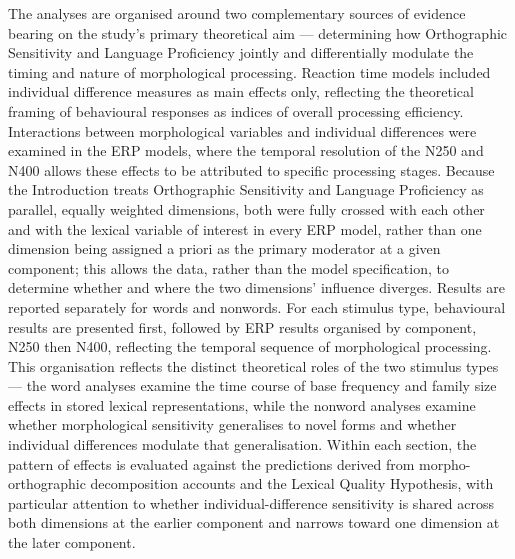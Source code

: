 \documentclass[utf8]{FrontiersinHarvard} %
\begin{document}
	The analyses are organised around two complementary sources of evidence bearing on the study's primary theoretical aim --- determining how Orthographic Sensitivity and Language Proficiency jointly and differentially modulate the timing and nature of morphological processing. Reaction time models included individual difference measures as main effects only, reflecting the theoretical framing of behavioural responses as indices of overall processing efficiency. Interactions between morphological variables and individual differences were examined in the ERP models, where the temporal resolution of the N250 and N400 allows these effects to be attributed to specific processing stages. Because the Introduction treats Orthographic Sensitivity and Language Proficiency as parallel, equally weighted dimensions, both were fully crossed with each other and with the lexical variable of interest in every ERP model, rather than one dimension being assigned a priori as the primary moderator at a given component; this allows the data, rather than the model specification, to determine whether and where the two dimensions' influence diverges. Results are reported separately for words and nonwords. For each stimulus type, behavioural results are presented first, followed by ERP results organised by component, N250 then N400, reflecting the temporal sequence of morphological processing. This organisation reflects the distinct theoretical roles of the two stimulus types --- the word analyses examine the time course of base frequency and family size effects in stored lexical representations, while the nonword analyses examine whether morphological sensitivity generalises to novel forms and whether individual differences modulate that generalisation. Within each section, the pattern of effects is evaluated against the predictions derived from morpho-orthographic decomposition accounts and the Lexical Quality Hypothesis, with particular attention to whether individual-difference sensitivity is shared across both dimensions at the earlier component and narrows toward one dimension at the later component.
	
\end{document}
